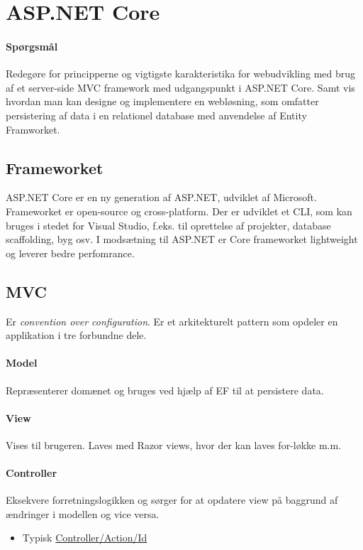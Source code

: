 \section{ASP.NET Core}

\paragraph{Spørgsmål}
Redegøre for principperne og vigtigste karakteristika for webudvikling med brug af et server-side MVC framework med udgangspunkt i ASP.NET Core. Samt vis hvordan man kan designe og implementere en	webløsning, som omfatter persistering af data i en relationel database med anvendelse af Entity Framworket.

\subsection{Frameworket}
ASP.NET Core er en ny generation af ASP.NET, udviklet af Microsoft. Frameworket er open-source og cross-platform.
Der er udviklet et CLI, som kan bruges i stedet for Visual Studio, f.eks. til oprettelse af projekter, database scaffolding, byg osv.
I modsætning til ASP.NET er Core frameworket lightweight og leverer bedre perfomrance.

\subsection{MVC}
Er \textit{convention over configuration}. Er et arkitekturelt pattern som opdeler en applikation i tre forbundne dele.

\paragraph{Model} Repræsenterer domænet og bruges ved hjælp af EF til at persistere data.

\paragraph{View} Vises til brugeren. Laves med Razor views, hvor der kan laves for-løkke m.m.

\paragraph{Controller} Eksekvere forretningslogikken og sørger for at opdatere view på baggrund af ændringer i modellen og vice versa.

\begin{itemize}
	\item Typisk \url{Controller/Action/Id}
\end{itemize}

